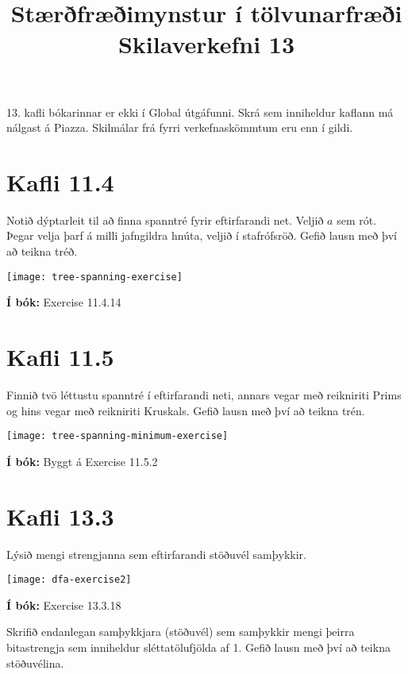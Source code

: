 \documentclass{article}
\title{Stærðfræðimynstur í tölvunarfræði \\ Skilaverkefni 13}
\author{}
\begin{document}
\maketitle

13. kafli bókarinnar er ekki í Global útgáfunni. Skrá sem inniheldur kaflann má nálgast á Piazza.
Skilmálar frá fyrri verkefnaskömmtum eru enn í gildi.

\section{Kafli 11.4}

\question Notið dýptarleit til að finna spanntré fyrir eftirfarandi net. Veljið $a$ sem rót. Þegar velja þarf á milli jafngildra hnúta, veljið í stafrófsröð. Gefið lausn með því að teikna tréð.

\begin{center}
\texttt{[image: tree-spanning-exercise]}
\end{center}

\textbf{Í bók:} Exercise 11.4.14

\section{Kafli 11.5}

\question Finnið tvö léttustu spanntré í eftirfarandi neti, annars vegar með reikniriti Prims og hins vegar með reikniriti Kruskals. Gefið lausn með því að teikna trén.

\begin{center}
\texttt{[image: tree-spanning-minimum-exercise]}
\end{center}

\textbf{Í bók:} Byggt á Exercise 11.5.2

\section{Kafli 13.3}

\question Lýsið mengi strengjanna sem eftirfarandi stöðuvél samþykkir.

\begin{center}
\texttt{[image: dfa-exercise2]}
\end{center}

\textbf{Í bók:} Exercise 13.3.18

\question Skrifið endanlegan samþykkjara (stöðuvél) sem samþykkir mengi þeirra bitastrengja sem inniheldur sléttatölufjölda af 1. Gefið lausn með því að teikna stöðuvélina.
\end{document}
